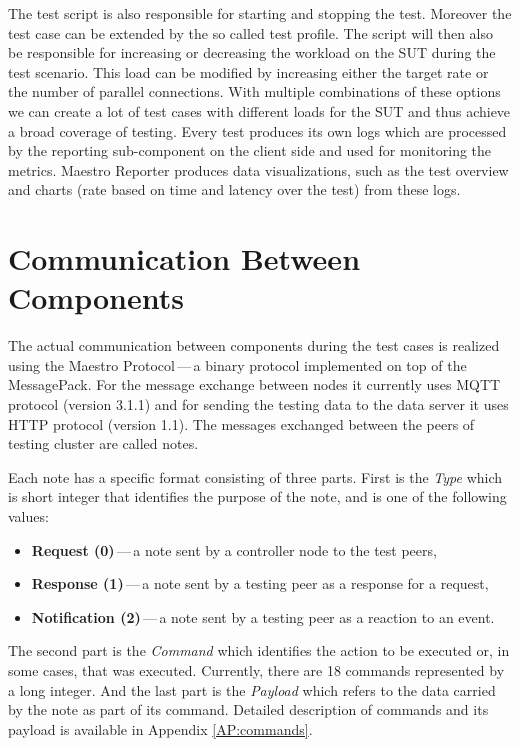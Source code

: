 The test script is also responsible for starting and stopping the test. Moreover the test case can be extended by the so called test profile. The script will then also be responsible for increasing or decreasing the workload on the SUT during the test scenario. This load can be modified by increasing either the target rate or the number of parallel connections. With multiple combinations of these options we can create a lot of test cases with different loads for the SUT and thus achieve a broad coverage of testing. Every test produces its own logs which are processed by the reporting sub-component on the client side and used for monitoring the metrics. Maestro Reporter produces data visualizations, such as the test overview and charts (rate based on time and latency over the test) from these logs.

\section{Communication Between Components}
\label{Communication Between Components}
The actual communication between components during the test cases is realized using the Maestro Protocol\,---\,a binary protocol implemented on top of the MessagePack\footnotemark{}. For the message exchange between nodes it currently uses MQTT protocol (version 3.1.1) and for sending the testing data to the data server it uses HTTP protocol (version 1.1). The messages exchanged between the peers of testing cluster are called notes.


Each note has a specific format consisting of three parts. First is the \emph{Type} which is short integer that identifies the purpose of the note, and is one of the following values:

\begin{itemize}
	\setlength\itemsep{0em}
	\item \textbf{Request (0)}\,---\,a note sent by a controller node to the test peers,
	\item \textbf{Response (1)}\,---\,a note sent by a testing peer as a response for a request,
	\item \textbf{Notification (2)}\,---\,a note sent by a testing peer as a reaction to an event.
\end{itemize}
The second part is the \emph{Command} which identifies the action to be executed or, in some cases, that was executed. Currently, there are 18 commands represented by a long integer. And the last part is the \emph{Payload} which refers to the data carried by the note as part of its command. Detailed description of commands and its payload is available in Appendix \ref{AP:commands}.


